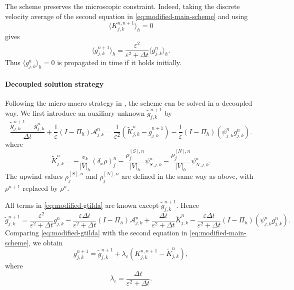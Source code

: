 \documentclass[11pt,twoside]{article}
\theoremstyle{plain}
\theoremstyle{nonumberplain}
\begin{document}
{The scheme preserves the microscopic constraint. Indeed, taking the
discrete velocity average of the second equation in
\eqref{eq:modified-main-scheme} and using
\[
\langle K_{j,k}^{n,n+1}\rangle_h=0
\]
gives
\[
\langle g_{j,k}^{n+1}\rangle_h
=
\frac{\varepsilon^2}{\varepsilon^2+\Delta t}
\langle g_{j,k}^{n}\rangle_h .
\]
Thus \(\langle g_{j,k}^{n}\rangle_h=0\) is propagated in time if it holds
initially.

\paragraph{Decoupled solution strategy}
Following the micro-macro strategy in \cite{lemou2008new}, the scheme can
be solved in a decoupled way. We first introduce an auxiliary unknown
\(\widetilde g_{j,k}^{n+1}\) by
\begin{equation}\label{eq:modified-gtilda}
\frac{\widetilde g_{j,k}^{n+1}-g_{j,k}^n}{\Delta t}
+
\frac1\varepsilon
(I-\Pi_h)\mathcal A_{j,k}^n
=
\frac1{\varepsilon^2}
\left(
\widetilde K_{j,k}^{n}
-
\widetilde g_{j,k}^{n+1}
\right)
-
\frac1\varepsilon
(I-\Pi_h)(\psi_{j,k}^n g_{j,k}^n).
\end{equation}
where
\[
\widetilde K_{j,k}^{n}
=
-\frac{v_k}{|V|_h}(\delta_x\rho)_j^{n}
-
\frac{\rho_j^{[S],n}}{|V|_h}\psi_{S,j,k}^n
-
\frac{\rho_j^{[N],n}}{|V|_h}\psi_{N,j,k}^n .
\]
The upwind values \(\rho_j^{[S],n}\) and \(\rho_j^{[N],n}\) are defined in
the same way as above, with \(\rho^{n+1}\) replaced by \(\rho^n\).

All terms in \eqref{eq:modified-gtilda} are known except
\(\widetilde g_{j,k}^{n+1}\). Hence
\[
\widetilde g_{j,k}^{n+1}
=
\frac{\varepsilon^2}{\varepsilon^2+\Delta t}g_{j,k}^n
-
\frac{\varepsilon\Delta t}{\varepsilon^2+\Delta t}
(I-\Pi_h)\mathcal A_{j,k}^n
+
\frac{\Delta t}{\varepsilon^2+\Delta t}
\widetilde K_{j,k}^{n}
-
\frac{\varepsilon\Delta t}{\varepsilon^2+\Delta t}
(I-\Pi_h)(\psi_{j,k}^n g_{j,k}^n).
\]
Comparing \eqref{eq:modified-gtilda} with the second equation in
\eqref{eq:modified-main-scheme}, we obtain
\begin{equation}\label{eq:modified-g-reconstruction}
g_{j,k}^{n+1}
=
\widetilde g_{j,k}^{n+1}
+
\lambda_\varepsilon
\left(
K_{j,k}^{n,n+1}
-
\widetilde K_{j,k}^{n}
\right),
\end{equation}
where
\[
\lambda_\varepsilon
=
\frac{\Delta t}{\varepsilon^2+\Delta t}.
\]

}
\end{document}
